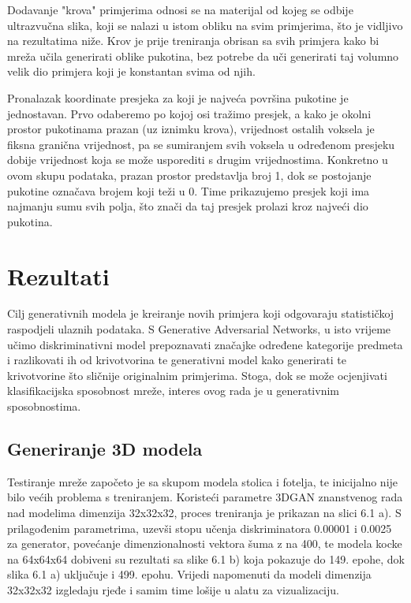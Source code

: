 \documentclass[times, utf8, diplomski]{fer}
\begin{document}
Dodavanje "krova" primjerima odnosi se na materijal od kojeg se odbije ultrazvučna slika, koji se nalazi u istom obliku na svim primjerima, što je vidljivo na rezultatima niže. Krov je prije treniranja obrisan sa svih primjera kako bi mreža učila generirati oblike pukotina, bez potrebe da uči generirati taj volumno velik dio primjera koji je konstantan svima od njih. 

Pronalazak koordinate presjeka za koji je najveća površina pukotine je jednostavan. Prvo odaberemo po kojoj osi tražimo presjek, a kako je okolni prostor pukotinama prazan (uz iznimku krova), vrijednost ostalih voksela je fiksna granična vrijednost, pa se sumiranjem svih voksela u određenom presjeku dobije vrijednost koja se može usporediti s drugim vrijednostima. Konkretno u ovom skupu podataka, prazan prostor predstavlja broj 1, dok se postojanje pukotine označava brojem koji teži u 0. Time prikazujemo presjek koji ima najmanju sumu svih polja, što znači da taj presjek prolazi kroz najveći dio pukotina.


\chapter{Rezultati}

Cilj generativnih modela je kreiranje novih primjera koji odgovaraju statističkoj raspodjeli ulaznih podataka. S Generative Adversarial Networks, u isto vrijeme učimo diskriminativni model prepoznavati značajke određene kategorije predmeta i razlikovati ih od krivotvorina te generativni model kako generirati te krivotvorine što sličnije originalnim primjerima. Stoga, dok se može ocjenjivati klasifikacijska sposobnost mreže, interes ovog rada je u generativnim sposobnostima.

\section{Generiranje 3D modela}
Testiranje mreže započeto je sa skupom modela stolica i fotelja, te inicijalno nije bilo većih problema s treniranjem. Koristeći parametre 3DGAN znanstvenog rada\cite{3dgan} nad modelima dimenzija 32x32x32, proces treniranja je prikazan na slici 6.1 a). S prilagođenim parametrima, uzevši stopu učenja diskriminatora 0.00001 i 0.0025 za generator, povećanje dimenzionalnosti vektora šuma z na 400, te modela kocke na 64x64x64 dobiveni su rezultati sa slike 6.1 b) koja pokazuje do 149. epohe, dok slika 6.1 a) uključuje i 499. epohu. Vrijedi napomenuti da modeli dimenzija 32x32x32 izgledaju rjeđe i samim time lošije u alatu za vizualizaciju.
\end{document}
